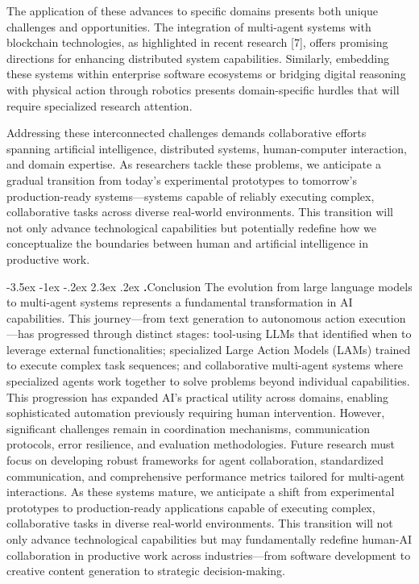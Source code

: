 \documentclass[journal,twoside,10pt]{IEEEtran}
\makeatletter
\renewcommand\section{\@startsection{section}{1}{\z@}%
                       {-3.5ex \@plus -1ex \@minus -.2ex}%
                       {2.3ex \@plus.2ex}%
                       {\normalfont\Large\bfseries\Roman{section}.\quad}}
\makeatother
\begin{document}
The application of these advances to specific domains presents both unique challenges and opportunities. The integration of multi-agent systems with blockchain technologies, as highlighted in recent research [7], offers promising directions for enhancing distributed system capabilities. Similarly, embedding these systems within enterprise software ecosystems or bridging digital reasoning with physical action through robotics presents domain-specific hurdles that will require specialized research attention.

Addressing these interconnected challenges demands collaborative efforts spanning artificial intelligence, distributed systems, human-computer interaction, and domain expertise. As researchers tackle these problems, we anticipate a gradual transition from today's experimental prototypes to tomorrow's production-ready systems—systems capable of reliably executing complex, collaborative tasks across diverse real-world environments. This transition will not only advance technological capabilities but potentially redefine how we conceptualize the boundaries between human and artificial intelligence in productive work.

\section{Conclusion}
The evolution from large language models to multi-agent systems represents a fundamental transformation in AI capabilities. This journey—from text generation to autonomous action execution—has progressed through distinct stages: tool-using LLMs that identified when to leverage external functionalities; specialized Large Action Models (LAMs) trained to execute complex task sequences; and collaborative multi-agent systems where specialized agents work together to solve problems beyond individual capabilities.
This progression has expanded AI's practical utility across domains, enabling sophisticated automation previously requiring human intervention. However, significant challenges remain in coordination mechanisms, communication protocols, error resilience, and evaluation methodologies. Future research must focus on developing robust frameworks for agent collaboration, standardized communication, and comprehensive performance metrics tailored for multi-agent interactions.
As these systems mature, we anticipate a shift from experimental prototypes to production-ready applications capable of executing complex, collaborative tasks in diverse real-world environments. This transition will not only advance technological capabilities but may fundamentally redefine human-AI collaboration in productive work across industries—from software development to creative content generation to strategic decision-making.



 
\end{document}
